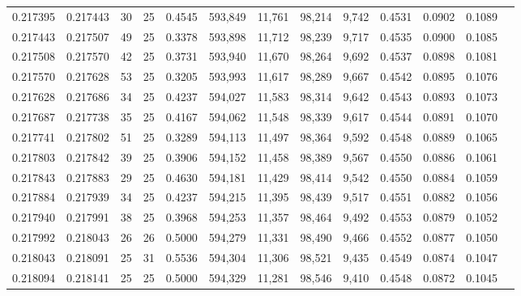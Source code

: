\begin{tabular}{rrrrrrrrrrrrr}
0.217395 & 0.217443 &  30 &  25 &                                     0.4545 & 593,849 &  11,761 &  98,214 &   9,742 & 0.4531 & 0.0902 & 0.1089 \\
0.217443 & 0.217507 &  49 &  25 &                                     0.3378 & 593,898 &  11,712 &  98,239 &   9,717 & 0.4535 & 0.0900 & 0.1085 \\
0.217508 & 0.217570 &  42 &  25 &                                     0.3731 & 593,940 &  11,670 &  98,264 &   9,692 & 0.4537 & 0.0898 & 0.1081 \\
0.217570 & 0.217628 &  53 &  25 &                                     0.3205 & 593,993 &  11,617 &  98,289 &   9,667 & 0.4542 & 0.0895 & 0.1076 \\
0.217628 & 0.217686 &  34 &  25 &                                     0.4237 & 594,027 &  11,583 &  98,314 &   9,642 & 0.4543 & 0.0893 & 0.1073 \\
0.217687 & 0.217738 &  35 &  25 &                                     0.4167 & 594,062 &  11,548 &  98,339 &   9,617 & 0.4544 & 0.0891 & 0.1070 \\
0.217741 & 0.217802 &  51 &  25 &                                     0.3289 & 594,113 &  11,497 &  98,364 &   9,592 & 0.4548 & 0.0889 & 0.1065 \\
0.217803 & 0.217842 &  39 &  25 &                                     0.3906 & 594,152 &  11,458 &  98,389 &   9,567 & 0.4550 & 0.0886 & 0.1061 \\
0.217843 & 0.217883 &  29 &  25 &                                     0.4630 & 594,181 &  11,429 &  98,414 &   9,542 & 0.4550 & 0.0884 & 0.1059 \\
0.217884 & 0.217939 &  34 &  25 &                                     0.4237 & 594,215 &  11,395 &  98,439 &   9,517 & 0.4551 & 0.0882 & 0.1056 \\
0.217940 & 0.217991 &  38 &  25 &                                     0.3968 & 594,253 &  11,357 &  98,464 &   9,492 & 0.4553 & 0.0879 & 0.1052 \\
0.217992 & 0.218043 &  26 &  26 &                                     0.5000 & 594,279 &  11,331 &  98,490 &   9,466 & 0.4552 & 0.0877 & 0.1050 \\
0.218043 & 0.218091 &  25 &  31 &                                     0.5536 & 594,304 &  11,306 &  98,521 &   9,435 & 0.4549 & 0.0874 & 0.1047 \\
0.218094 & 0.218141 &  25 &  25 &                                     0.5000 & 594,329 &  11,281 &  98,546 &   9,410 & 0.4548 & 0.0872 & 0.1045 \\

\end{tabular}
